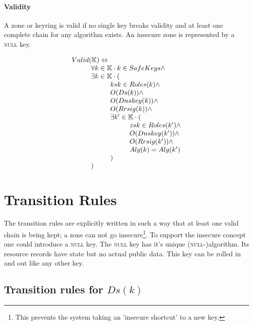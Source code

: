 \documentclass[twoside,english, a4paper]{article}
\begin{document}
\paragraph{Validity} A zone or keyring is valid if no single key 
breaks validity and at least one complete chain for any algorithm 
exists. An insecure zone is represented by a \textsc{null} key.

\begin{displaymath}
\begin{array}{l}
Valid(\mathbb{K}) \Leftrightarrow \\
\hskip 1cm	\forall k \in \mathbb{K} \cdot k \in SafeKeys \wedge \\
\hskip 1cm	\exists k \in \mathbb{K} \cdot ( \\
\hskip 2cm		ksk \in Roles(k) \wedge \\
\hskip 2cm		O(Ds(k)) \wedge \\
\hskip 2cm		O(Dnskey(k)) \wedge \\
\hskip 2cm		O(Rrsig(k)) \wedge \\
\hskip 2cm		\exists k' \in \mathbb{K} \cdot ( \\
\hskip 3cm			zsk \in Roles(k') \wedge \\
\hskip 3cm			O(Dnskey(k')) \wedge \\
\hskip 3cm			O(Rrsig(k')) \wedge \\
\hskip 3cm			Alg(k)=Alg(k')\\
\hskip 2cm		)\\
\hskip 1cm	)
\end{array}
\end{displaymath}

\section{Transition Rules}

The transition rules are explicitly written in such a way that at 
least one valid chain is being kept; a zone can not go insecure\footnote{
This prevents the system taking an 'insecure shortcut' to a new key.}. To support the insecure concept one could introduce a 
\textsc{null} key. The \textsc{null} key has it's unique (\textsc 
{null}-)algorithm. Its resource records have state but no actual 
public data. This key can be rolled in and out like any other key.

\subsection{Transition rules for $Ds(k)$}
\end{document}
